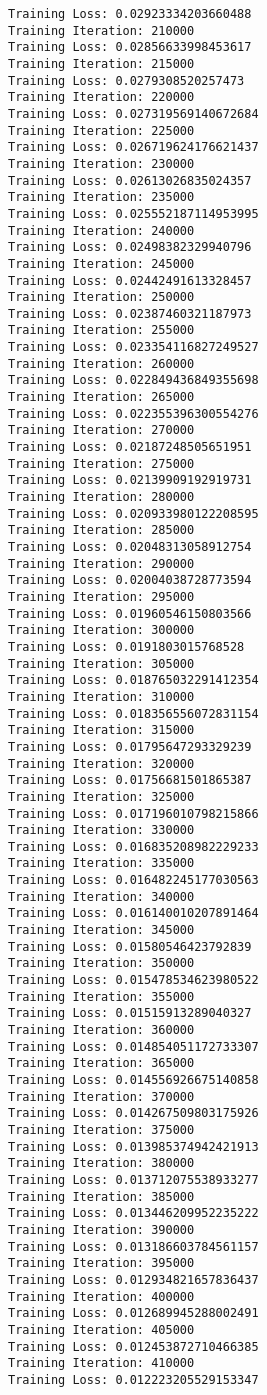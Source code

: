 \documentclass[11pt]{article}
\begin{document}
\begin{Verbatim}[commandchars=\\\{\}]
Training Loss: 0.02923334203660488
Training Iteration: 210000
Training Loss: 0.02856633998453617
Training Iteration: 215000
Training Loss: 0.0279308520257473
Training Iteration: 220000
Training Loss: 0.027319569140672684
Training Iteration: 225000
Training Loss: 0.026719624176621437
Training Iteration: 230000
Training Loss: 0.02613026835024357
Training Iteration: 235000
Training Loss: 0.025552187114953995
Training Iteration: 240000
Training Loss: 0.02498382329940796
Training Iteration: 245000
Training Loss: 0.02442491613328457
Training Iteration: 250000
Training Loss: 0.02387460321187973
Training Iteration: 255000
Training Loss: 0.023354116827249527
Training Iteration: 260000
Training Loss: 0.022849436849355698
Training Iteration: 265000
Training Loss: 0.022355396300554276
Training Iteration: 270000
Training Loss: 0.02187248505651951
Training Iteration: 275000
Training Loss: 0.02139909192919731
Training Iteration: 280000
Training Loss: 0.020933980122208595
Training Iteration: 285000
Training Loss: 0.02048313058912754
Training Iteration: 290000
Training Loss: 0.02004038728773594
Training Iteration: 295000
Training Loss: 0.01960546150803566
Training Iteration: 300000
Training Loss: 0.0191803015768528
Training Iteration: 305000
Training Loss: 0.018765032291412354
Training Iteration: 310000
Training Loss: 0.018356556072831154
Training Iteration: 315000
Training Loss: 0.01795647293329239
Training Iteration: 320000
Training Loss: 0.01756681501865387
Training Iteration: 325000
Training Loss: 0.017196010798215866
Training Iteration: 330000
Training Loss: 0.016835208982229233
Training Iteration: 335000
Training Loss: 0.016482245177030563
Training Iteration: 340000
Training Loss: 0.016140010207891464
Training Iteration: 345000
Training Loss: 0.01580546423792839
Training Iteration: 350000
Training Loss: 0.015478534623980522
Training Iteration: 355000
Training Loss: 0.01515913289040327
Training Iteration: 360000
Training Loss: 0.014854051172733307
Training Iteration: 365000
Training Loss: 0.014556926675140858
Training Iteration: 370000
Training Loss: 0.014267509803175926
Training Iteration: 375000
Training Loss: 0.013985374942421913
Training Iteration: 380000
Training Loss: 0.013712075538933277
Training Iteration: 385000
Training Loss: 0.013446209952235222
Training Iteration: 390000
Training Loss: 0.013186603784561157
Training Iteration: 395000
Training Loss: 0.012934821657836437
Training Iteration: 400000
Training Loss: 0.012689945288002491
Training Iteration: 405000
Training Loss: 0.012453872710466385
Training Iteration: 410000
Training Loss: 0.012223205529153347

\end{Verbatim}
\end{document}
